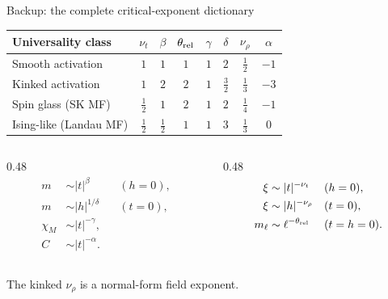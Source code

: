 \documentclass[aspectratio=169,10pt]{beamer}
\newcommand{\scope}[1]{{\footnotesize\color{caveat}#1}}
\begin{document}
\begin{frame}{Backup: the complete critical-exponent dictionary}
  \begin{center}
    \small
    \setlength{\tabcolsep}{3.5pt}
    \renewcommand{\arraystretch}{1.10}
    \begin{tabular}{@{}lccccccc@{}}
      \toprule
      Universality class & \(\nu_t\) & \(\beta\) & \(\theta_{\rm rel}\) &
      \(\gamma\) & \(\delta\) & \(\nu_\rho\) & \(\alpha\) \\
      \midrule
      Smooth activation & \(1\) & \(1\) & \(1\) & \(1\) & \(2\) & \(\tfrac12\) & \(-1\) \\
      Kinked activation & \(1\) & \(2\) & \(2\) & \(1\) & \(\tfrac32\) & \(\tfrac13\) & \(-3\) \\
      Spin glass (SK MF) & \(\tfrac12\) & \(1\) & \(2\) & \(1\) & \(2\) & \(\tfrac14\) & \(-1\) \\
      Ising-like (Landau MF) & \(\tfrac12\) & \(\tfrac12\) & \(1\) & \(1\) & \(3\) & \(\tfrac13\) & \(0\) \\
      \bottomrule
    \end{tabular}
  \end{center}

  \vspace{0.30em}
  \begin{columns}[T,onlytextwidth]
    \begin{column}{0.48\textwidth}
      \small
      \setlength{\jot}{1.5pt}
      \begin{align*}
        m&\sim |t|^\beta &&(h=0),\\
        m&\sim |h|^{1/\delta} &&(t=0),\\
        \chi_M&\sim |t|^{-\gamma},\\
        C&\sim |t|^{-\alpha}.
      \end{align*}
    \end{column}
    \begin{column}{0.48\textwidth}
      \small
      \setlength{\jot}{1.5pt}
      \begin{align*}
        \xi&\sim |t|^{-\nu_t} &&(h=0),\\
        \xi&\sim |h|^{-\nu_\rho} &&(t=0),\\
        m_\ell&\sim \ell^{-\theta_{\rm rel}} &&(t=h=0).
      \end{align*}
    \end{column}
  \end{columns}

  \vspace{0.20em}
  \scope{The kinked \(\nu_\rho\) is a normal-form field exponent.}
\end{frame}
\end{document}
